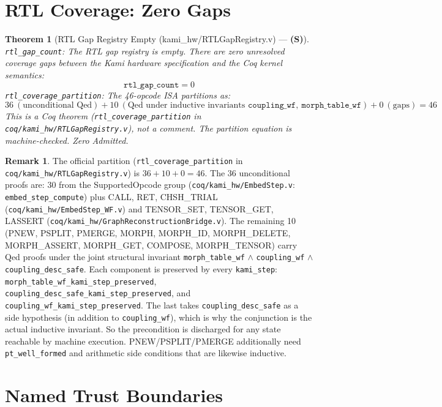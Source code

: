 \documentclass[11pt, a4paper]{report}
\theoremstyle{definition}
\newtheorem{remark}{Remark}[chapter]
\theoremstyle{plain}
\newtheorem{theorem}{Theorem}[chapter]
\begin{document}
\section{RTL Coverage: Zero Gaps}

\begin{theorem}[RTL Gap Registry Empty {\normalfont (kami\_hw/RTLGapRegistry.v)} --- \textbf{(S)}]
\texttt{rtl\_gap\_count}: The RTL gap registry is empty. There are zero unresolved coverage gaps between the Kami hardware specification and the Coq kernel semantics:
\[ \texttt{rtl\_gap\_count} = 0 \]
\texttt{rtl\_coverage\_partition}: The 46-opcode ISA partitions as:
\[ 36\ (\text{unconditional Qed}) + 10\ (\text{Qed under inductive invariants } \texttt{coupling\_wf},~\texttt{morph\_table\_wf}) + 0\ (\text{gaps}) = 46 \]
This is a Coq theorem (\texttt{rtl\_coverage\_partition} in \texttt{coq/kami\_hw/RTLGapRegistry.v}), not a comment. The partition equation is machine-checked. Zero Admitted.
\end{theorem}

\begin{remark}
The official partition (\texttt{rtl\_coverage\_partition} in \texttt{coq/kami\_hw/RTLGapRegistry.v}) is $36 + 10 + 0 = 46$. The 36 unconditional proofs are: 30 from the SupportedOpcode group (\texttt{coq/kami\_hw/EmbedStep.v}: \texttt{embed\_step\_compute}) plus CALL, RET, CHSH\_TRIAL (\texttt{coq/kami\_hw/EmbedStep\_WF.v}) and TENSOR\_SET, TENSOR\_GET, LASSERT (\texttt{coq/kami\_hw/GraphReconstructionBridge.v}). The remaining 10 (PNEW, PSPLIT, PMERGE, MORPH, MORPH\_ID, MORPH\_DELETE, MORPH\_ASSERT, MORPH\_GET, COMPOSE, MORPH\_TENSOR) carry Qed proofs under the joint structural invariant \texttt{morph\_table\_wf} $\wedge$ \texttt{coupling\_wf} $\wedge$ \texttt{coupling\_desc\_safe}. Each component is preserved by every \texttt{kami\_step}: \texttt{morph\_table\_wf\_kami\_step\_preserved}, \texttt{coupling\_desc\_safe\_kami\_step\_preserved}, and \texttt{coupling\_wf\_kami\_step\_preserved}. The last takes \texttt{coupling\_desc\_safe} as a side hypothesis (in addition to \texttt{coupling\_wf}), which is why the conjunction is the actual inductive invariant. So the precondition is discharged for any state reachable by machine execution. PNEW/PSPLIT/PMERGE additionally need \texttt{pt\_well\_formed} and arithmetic side conditions that are likewise inductive.
\end{remark}

\section{Named Trust Boundaries}
\end{document}

